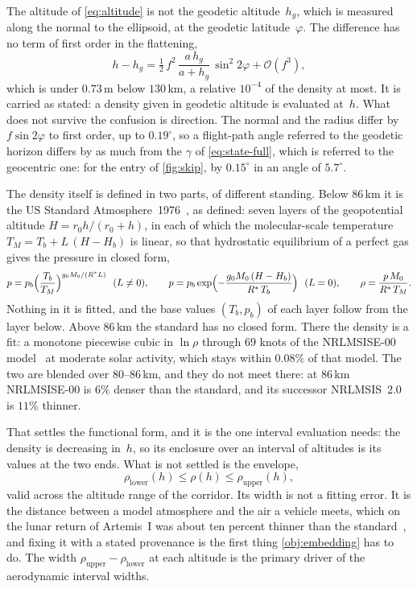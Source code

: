 \begin{remark}\label{rem:geodetic-altitude}
The altitude of \cref{eq:altitude} is not the geodetic altitude~$h_g$, which
is measured along the normal to the ellipsoid, at the geodetic
latitude~$\varphi$. The difference has no term of first order in the
flattening,
\[
  h - h_g = \tfrac12\,f^2\,\frac{a\,h_g}{a+h_g}\,\sin^2 2\varphi
            + \mathcal{O}(f^3) ,
\]
which is under $0.73$\,m below $130$\,km, a relative $10^{-4}$ of the
density at most. It is carried as stated: a density given in geodetic
altitude is evaluated at~$h$. What does not survive the confusion is
direction. The normal and the radius differ by $f\sin 2\varphi$ to first
order, up to $0.19^\circ$, so a flight-path angle referred to the geodetic
horizon differs by as much from the $\gamma$ of \cref{eq:state-full}, which
is referred to the geocentric one: for the entry of \cref{fig:skip}, by
$0.15^\circ$ in an angle of $5.7^\circ$.
\end{remark}

The density itself is defined in two parts, of different standing. Below
$86$\,km it is the US Standard Atmosphere~1976~\cite{noaa1976standard}, as
defined: seven layers of the geopotential altitude $H = r_0h/(r_0+h)$, in
each of which the molecular-scale temperature $T_M = T_b + L\,(H - H_b)$ is
linear, so that hydrostatic equilibrium of a perfect gas gives the pressure
in closed form,
\begin{equation}\label{eq:standard-layer}
  p = p_b\Bigl(\frac{T_b}{T_M}\Bigr)^{g_0M_0/(R^*L)}
  \ \ (L\neq0),
  \qquad
  p = p_b\exp\Bigl(-\frac{g_0M_0\,(H-H_b)}{R^*\,T_b}\Bigr)
  \ \ (L=0),
  \qquad
  \rho = \frac{p\,M_0}{R^*\,T_M} .
\end{equation}
Nothing in it is fitted, and the base values $(T_b,p_b)$ of each layer
follow from the layer below. Above $86$\,km the standard has no closed
form. There the density is a fit: a monotone piecewise cubic in $\ln\rho$
through $69$ knots of the NRLMSISE-00 model~\cite{picone2002nrlmsise} at
moderate solar activity, which stays within $0.08\%$ of that model. The two
are blended over $80$--$86$\,km, and they do not meet there: at $86$\,km
NRLMSISE-00 is $6\%$ denser than the standard, and its successor
NRLMSIS~2.0~\cite{emmert2021nrlmsis} is $11\%$ thinner.

That settles the functional form, and it is the one interval evaluation
needs: the density is decreasing in~$h$, so its enclosure over an interval
of altitudes is its values at the two ends. What is not settled is the
envelope,
\[
  \rho_{\mathrm{lower}}(h) \le \rho(h) \le \rho_{\mathrm{upper}}(h) ,
\]
valid across the altitude range of the corridor. Its width is not a fitting
error. It is the distance between a model atmosphere and the air a vehicle
meets, which on the lunar return of Artemis~I was about ten percent thinner
than the standard~\cite{rea2024orion}, and fixing it with a stated
provenance is the first thing \cref{obj:embedding} has to do. The width
$\rho_{\mathrm{upper}} - \rho_{\mathrm{lower}}$ at each altitude is the
primary driver of the aerodynamic interval widths.


